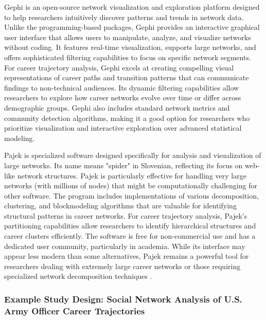 \documentclass[../main.tex]{subfiles}
\begin{document}

Gephi is an open-source network visualization and exploration platform designed to help researchers intuitively discover patterns and trends in network data. Unlike the programming-based packages, Gephi provides an interactive graphical user interface that allows users to manipulate, analyze, and visualize networks without coding. It features real-time visualization, supports large networks, and offers sophisticated filtering capabilities to focus on specific network segments. For career trajectory analysis, Gephi excels at creating compelling visual representations of career paths and transition patterns that can communicate findings to non-technical audiences. Its dynamic filtering capabilities allow researchers to explore how career networks evolve over time or differ across demographic groups. Gephi also includes standard network metrics and community detection algorithms, making it a good option for researchers who prioritize visualization and interactive exploration over advanced statistical modeling.


Pajek is specialized software designed specifically for analysis and visualization of large networks. Its name means "spider" in Slovenian, reflecting its focus on web-like network structures. Pajek is particularly effective for handling very large networks (with millions of nodes) that might be computationally challenging for other software. The program includes implementations of various decomposition, clustering, and blockmodeling algorithms that are valuable for identifying structural patterns in career networks. For career trajectory analysis, Pajek's partitioning capabilities allow researchers to identify hierarchical structures and career clusters efficiently. The software is free for non-commercial use and has a dedicated user community, particularly in academia. While its interface may appear less modern than some alternatives, Pajek remains a powerful tool for researchers dealing with extremely large career networks or those requiring specialized network decomposition techniques \citep{butts_methodological_2008}.

\subsubsection{Example Study Design: Social Network Analysis of U.S. Army Officer Career Trajectories}

\end{document}
